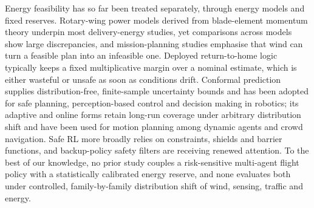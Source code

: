 Energy feasibility has so far been treated separately, through energy models and fixed reserves. Rotary-wing power models derived from blade-element momentum theory\cite{zeng2019energy} underpin most delivery-energy studies, yet comparisons across models show large discrepancies\cite{zhang2021energy}, and mission-planning studies emphasise that wind can turn a feasible plan into an infeasible one\cite{thibbotuwawa2020weather,cheng2020energy}. Deployed return-to-home logic typically keeps a fixed multiplicative margin over a nominal estimate, which is either wasteful or unsafe as soon as conditions drift. Conformal prediction supplies distribution-free, finite-sample uncertainty bounds\cite{vovk2005algorithmic,angelopoulos2023gentle} and has been adopted for safe planning, perception-based control and decision making in robotics\cite{lindemann2023safe,lindemann2025formal,yang2023perception,lekeufack2024cdt}; its adaptive and online forms retain long-run coverage under arbitrary distribution shift\cite{gibbs2021aci,angelopoulos2023pid,barber2023beyond} and have been used for motion planning among dynamic agents and crowd navigation\cite{dixit2023adaptive,sheng2024pomdp,yao2025crowd}. Safe RL more broadly relies on constraints, shields and barrier functions\cite{garcia2015survey,brunke2022safe,gu2024review,achiam2017cpo,alshiekh2018shielding,ames2019cbf}, and backup-policy safety filters are receiving renewed attention\cite{kim2026backup}. To the best of our knowledge, no prior study couples a risk-sensitive multi-agent flight policy with a statistically calibrated energy reserve, and none evaluates both under controlled, family-by-family distribution shift of wind, sensing, traffic and energy.
